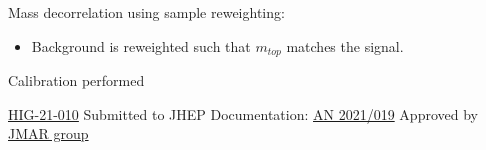 {  \vspace{-0.05cm}
  
  Mass decorrelation using sample reweighting:

  \begin{itemize}
    \small
  \item \textcolor{kRed}{Background} is reweighted such that $m_{top}$ matches the \textcolor{kDarkGreen}{signal}.
  \end{itemize}

  \vspace{-0.3cm}

  \threeColumns
      {}
      {}
      {
          
        \footnotesize
        \vspace{1.3cm}

        Calibration performed

        \vspace{0.5cm}
        
        \href{http://cms-results.web.cern.ch/cms-results/public-results/publications/HIG-21-010/index.html}{\textcolor{kBlue}{HIG-21-010}}
        Submitted to JHEP\newline
        \vspace{0.1cm}Documentation: \href{https://cms.cern.ch/iCMS/user/noteinfo?cmsnoteid=CMS\%20AN-2021/019}{\textcolor{kBlue}{AN 2021/019}}\newline
        \vspace{0.1cm}Approved by \href{https://indico.cern.ch/event/1042288/contributions/4380251/attachments/2256031/3920589/updated_TopTag_JMAR_06Jul2021.pdf}{\textcolor{kBlue}{JMAR group}}

      }

}
  
